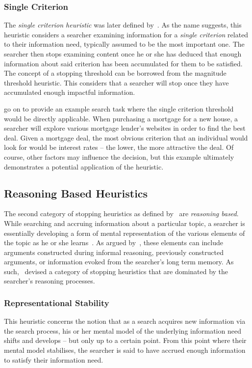 \subsubsection{Single Criterion}
The \emph{single criterion heuristic} was later defined by~\cite{browne2005stopping_rules}. As the name suggests, this heuristic considers a searcher examining information for a \emph{single criterion} related to their information need, typically assumed to be the most important one. The searcher then stops examining content once he or she has deduced that enough information about said criterion has been accumulated for them to be satisfied. The concept of a stopping threshold can be borrowed from the magnitude threshold heuristic. This considers that a searcher will stop once they have accumulated enough impactful information.

\cite{browne2005stopping_rules} go on to provide an example search task where the single criterion threshold would be directly applicable. When purchasing a mortgage for a new house, a searcher will explore various mortgage lender's websites in order to find the best deal. Given a mortgage deal, the most obvious criterion that an individual would look for would be interest rates -- the lower, the more attractive the deal. Of course, other factors may influence the decision, but this example ultimately demonstrates a potential application of the heuristic.

\subsection{Reasoning Based Heuristics}
The second category of stopping heuristics as defined by~\citep{nickles1995judgment} are \emph{reasoning based}. While searching and accruing information about a particular topic, a searcher is essentially developing a form of mental representation of the various elements of the topic as he or she learns~\citep{yates1990decision_making}. As argued by~\citep{nickles1995judgment}, these elements can include arguments constructed during informal reasoning, previously constructed arguments, or information evoked from the searcher's long term memory. As such,~\citep{nickles1995judgment} devised a category of stopping heuristics that are dominated by the searcher's reasoning processes.

\subsubsection{Representational Stability}\label{sec:stopping_background:heuristics:reasoning:representational}
This heuristic concerns the notion that as a search acquires new information via the search process, his or her mental model of the underlying information need shifts and develops -- but only up to a certain point. From this point where their mental model stabilises, the searcher is said to have accrued enough information to satisfy their information need.

